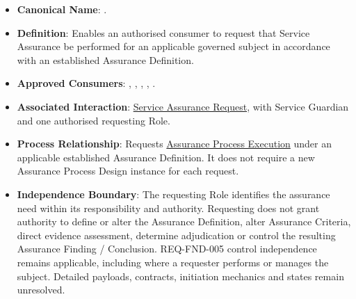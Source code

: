 \begin{itemize}

\item 
\textbf{Canonical Name}: \texttt{}.



\item 
\textbf{Definition}: Enables an authorised consumer to request that Service Assurance be performed for an applicable governed subject in accordance with an established Assurance Definition.



\item 
\textbf{Approved Consumers}: \texttt{}, \texttt{}, \texttt{}, \texttt{}, \texttt{}.



\item 
\textbf{Associated Interaction}: \href{https://github.com/fhirfactory/harmonia/blob/98410db60155198a75f74c79d98060070209faa1/docs/markdown/03-business-architecture/collaborations-interactions/interactions.md\#service-assurance-request}{Service Assurance Request}, with Service Guardian and one authorised requesting Role.



\item 
\textbf{Process Relationship}: Requests \href{https://github.com/fhirfactory/harmonia/blob/98410db60155198a75f74c79d98060070209faa1/docs/markdown/03-business-architecture/processes/business-processes.md\#assurance-process-execution}{Assurance Process Execution} under an applicable established Assurance Definition. It does not require a new Assurance Process Design instance for each request.



\item 
\textbf{Independence Boundary}: The requesting Role identifies the assurance need within its responsibility and authority. Requesting does not grant authority to define or alter the Assurance Definition, alter Assurance Criteria, direct evidence assessment, determine adjudication or control the resulting Assurance Finding /\allowbreak{} Conclusion. REQ-FND-005 control independence remains applicable, including where a requester performs or manages the subject. Detailed payloads, contracts, initiation mechanics and states remain unresolved.



\end{itemize}
\label{rad:assurance:173}



